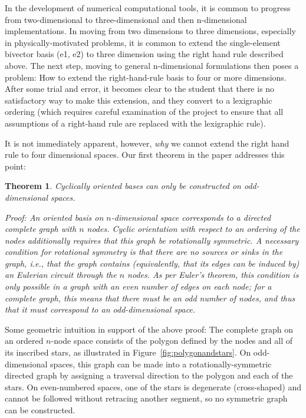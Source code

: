 \documentclass[11pt]{article}
\newtheorem{theorem}{Theorem}[section]
\begin{document}
In the development of numerical computational tools, it is common to progress from two-dimensional to three-dimensional and then n-dimensional implementations. In moving from two dimensions to three dimensions, especially in physically-motivated problems, it is common to extend the single-element bivector basis (e1, e2) to three dimension using the right hand rule described above. The next step, moving to general n-dimensional formulations then poses a problem: How to extend the right-hand-rule basis to four or more dimensions. After some trial and error, it becomes clear to the student that there is no satisfactory way to make this extension, and they convert to a lexigraphic ordering (which requires careful examination of the project to ensure that all assumptions of a right-hand rule are replaced with the lexigraphic rule).

It is not immediately apparent, however, \emph{why} we cannot extend the right hand rule to four dimensional spaces. Our first theorem in the paper addresses this point:



\begin{theorem}{Cyclically oriented bases can only be constructed on odd-dimensional spaces.}

Proof: An oriented basis on $n$-dimensional space corresponds to a directed complete graph with $n$ nodes. Cyclic orientation with respect to an ordering of the nodes additionally requires that this graph be rotationally symmetric. A necessary condition for rotational symmetry is that there are no sources or sinks in the graph, i.e., that the graph contains (equivalently, that its edges can be induced by) an Eulerian circuit through the $n$ nodes. As per Euler’s theorem, this condition is only possible in a graph with an even number of edges on each node; for a complete graph, this means that there must be an odd number of nodes, and thus that it must correspond to an odd-dimensional space.

\end{theorem}


Some geometric intuition in support of the above proof: The complete graph on an ordered $n$-node space consists of the polygon defined by the nodes and all of its inscribed stars, as illustrated in Figure~\ref{fig:polygonandstars}. On odd-dimensional spaces, this graph can be made into a rotationally-symmetric directed graph by assigning a traversal direction to the polygon and each of the stars. On even-numbered spaces, one of the stars is degenerate (cross-shaped) and cannot be followed without retracing another segment, so no symmetric graph can be constructed.
\end{document}
